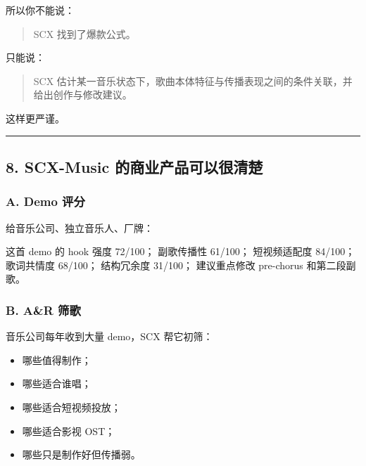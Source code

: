\documentclass[
  12pt,
]{ctexart}
\newenvironment{Shaded}{}{}
\newcommand{\NormalTok}[1]{#1}
\providecommand{\tightlist}{%
  \setlength{\itemsep}{0pt}\setlength{\parskip}{0pt}}
\begin{document}
所以你不能说：

\begin{quote}
SCX 找到了爆款公式。
\end{quote}

只能说：

\begin{quote}
SCX
估计某一音乐状态下，歌曲本体特征与传播表现之间的条件关联，并给出创作与修改建议。
\end{quote}

这样更严谨。

\begin{center}\rule{0.5\linewidth}{0.5pt}\end{center}

\subsection{8. SCX-Music
的商业产品可以很清楚}\label{scx-music-ux7684ux5546ux4e1aux4ea7ux54c1ux53efux4ee5ux5f88ux6e05ux695a}

\subsubsection{A. Demo 评分}\label{a.-demo-ux8bc4ux5206}

给音乐公司、独立音乐人、厂牌：

\begin{Shaded}
\begin{Highlighting}[]
\NormalTok{这首 demo 的 hook 强度 72/100；}
\NormalTok{副歌传播性 61/100；}
\NormalTok{短视频适配度 84/100；}
\NormalTok{歌词共情度 68/100；}
\NormalTok{结构冗余度 31/100；}
\NormalTok{建议重点修改 pre{-}chorus 和第二段副歌。}
\end{Highlighting}
\end{Shaded}

\subsubsection{B. A\&R 筛歌}\label{b.-ar-ux7b5bux6b4c}

音乐公司每年收到大量 demo，SCX 帮它初筛：

\begin{itemize}
\tightlist
\item
  哪些值得制作；
\item
  哪些适合谁唱；
\item
  哪些适合短视频投放；
\item
  哪些适合影视 OST；
\item
  哪些只是制作好但传播弱。
\end{itemize}
\end{document}
